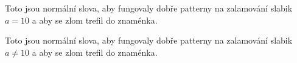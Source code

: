 \documentclass[12pt]{article}
\begin{document}
Toto jsou normální slova, aby fungovaly dobře patterny na zalamování
slabik~$a=10$ a aby se zlom trefil do znaménka.

Toto jsou normální slova, aby fungovaly dobře patterny na zalamování
slabik~$a\neq10$ a aby se zlom trefil do znaménka.
\end{document}
